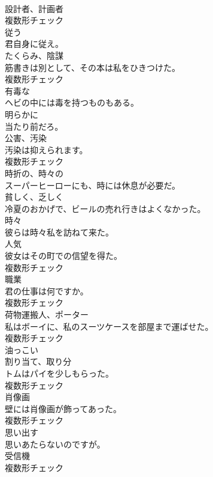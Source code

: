 \documentclass[8pt]{extreport}
\begin{document}
\begin{CJK}{UTF8}{min}
\\	[名詞]	設計者、計画者	
\\	複数形チェック
\\	[動詞]	従う	
\\	君自身に従え。	
\\	[名詞]	たくらみ、陰謀	
\\	筋書きは別として、その本は私をひきつけた。	
\\	複数形チェック
\\	[形容詞]	有毒な	
\\	ヘビの中には毒を持つものもある。	
\\	[副詞]	明らかに	
\\	当たり前だろ。	
\\	[名詞]	公害、汚染	
\\	汚染は抑えられます。	
\\	複数形チェック
\\	[形容詞]	時折の、時々の	
\\	スーパーヒーローにも、時には休息が必要だ。	
\\	[副詞]	貧しく、乏しく	
\\	冷夏のおかげで、ビールの売れ行きはよくなかった。	
\\	[副詞]	時々	
\\	彼らは時々私を訪ねて来た。	
\\	[名詞]	人気	
\\	彼女はその町での信望を得た。	
\\	複数形チェック
\\	[名詞]	職業	
\\	君の仕事は何ですか。	
\\	複数形チェック
\\	[名詞]	荷物運搬人、ポーター	
\\	私はボーイに、私のスーツケースを部屋まで運ばせた。	
\\	複数形チェック
\\	[形容詞]	油っこい	
\\	[名詞]	割り当て、取り分	
\\	トムはパイを少しもらった。	
\\	複数形チェック
\\	[名詞]	肖像画	
\\	壁には肖像画が飾ってあった。	
\\	複数形チェック
\\	[動詞]	思い出す	
\\	思いあたらないのですが。	
\\	[名詞]	受信機	
\\	複数形チェック

\end{CJK}
\end{document}
